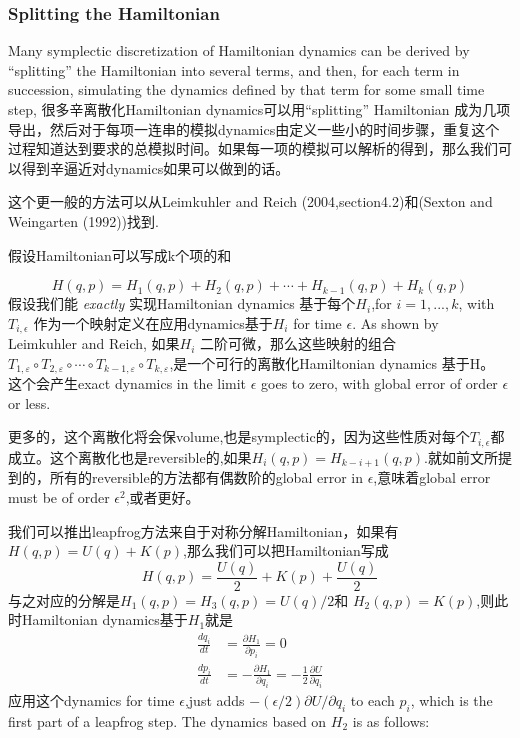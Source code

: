 \documentclass[
]{book}
\theoremstyle{definition}
\theoremstyle{definition}
\theoremstyle{definition}
\theoremstyle{remark}
\begin{document}
\hypertarget{splitting-the-hamiltonian}{%
\subsubsection{Splitting the Hamiltonian}\label{splitting-the-hamiltonian}}

Many symplectic discretization of Hamiltonian dynamics can be derived by ``splitting'' the Hamiltonian into several terms, and then, for each term in succession, simulating the dynamics defined by that term for some small time step,
很多辛离散化Hamiltonian dynamics可以用``splitting'' Hamiltonian 成为几项导出，然后对于每项一连串的模拟dynamics由定义一些小的时间步骤，重复这个过程知道达到要求的总模拟时间。如果每一项的模拟可以解析的得到，那么我们可以得到辛逼近对dynamics如果可以做到的话。

这个更一般的方法可以从Leimkuhler and Reich (2004,section4.2)和(Sexton and Weingarten (1992))找到.

假设Hamiltonian可以写成k个项的和

\[
H(q, p)=H_{1}(q, p)+H_{2}(q, p)+\cdots+H_{k-1}(q, p)+H_{k}(q, p)
\]
假设我们能 \emph{exactly} 实现Hamiltonian dynamics 基于每个\(H_i\),for \(i=1,...,k\), with \(T_{i,\epsilon}\) 作为一个映射定义在应用dynamics基于\(H_i\) for time \(\epsilon\). As shown by Leimkuhler and Reich, 如果\(H_i\) 二阶可微，那么这些映射的组合\(T_{1, \varepsilon} \circ T_{2, \varepsilon} \circ \cdots \circ T_{k-1, \varepsilon} \circ T_{k, \varepsilon}\),是一个可行的离散化Hamiltonian dynamics 基于H。 这个会产生exact dynamics in the limit \(\epsilon\) goes to zero, with global error of order \(\epsilon\) or less.

更多的，这个离散化将会保volume,也是symplectic的，因为这些性质对每个\(T_{i,\epsilon}\)都成立。这个离散化也是reversible的,如果\(H_{i}(q, p)=H_{k-i+1}(q, p)\).就如前文所提到的，所有的reversible的方法都有偶数阶的global error in \(\epsilon\),意味着global error must be of order \(\epsilon^2\),或者更好。

我们可以推出leapfrog方法来自于对称分解Hamiltonian，如果有\(H(q, p)=U(q)+K(p)\),那么我们可以把Hamiltonian写成
\[
H(q, p)=\frac{U(q)}{2}+K(p)+\frac{U(q)}{2}
\]
与之对应的分解是\(H_{1}(q, p)=H_{3}(q, p)=U(q) / 2\)和 \(H_{2}(q, p)=K(p)\),则此时Hamiltonian dynamics基于\(H_1\)就是
\[
\begin{aligned} \frac{d q_{i}}{d t} &=\frac{\partial H_{1}}{\partial p_{i}}=0 \\ \frac{d p_{i}}{d t} &=-\frac{\partial H_{1}}{\partial q_{i}}=-\frac{1}{2} \frac{\partial U}{\partial q_{i}} \end{aligned}
\]
应用这个dynamics for time \(\epsilon\),just adds \(-(\epsilon/2)\partial U / \partial q_{i}\) to each \(p_i\), which is the first part of a leapfrog step. The dynamics based on \(H_2\) is as follows:
\end{document}
